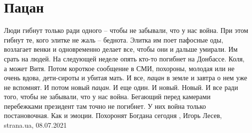  
 
 
 
 
\chapter{Пацан}

Люди гибнут только ради одного – чтобы не забывали, что у нас война. При этом
гибнут те, кого элитке не жаль – беднота. Элитка им поет пафосные оды,
возлагает венки и одновременно делает все, чтобы они и дальше умирали.  Им
срать на людей. На следующей неделе опять кто-то погибнет на Донбассе. Коля, а
может Витя. Потом короткое сообщение в СМИ, похороны, молодая или не очень
вдова, дети-сироты и убитая мать. И все, \emph{пацан} в земле и завтра о нем
уже не вспомнят. И потом новый \emph{пацан}. И еще один. И новый. Новый. И все
ради того, чтобы не забывали, что у нас война.  Бегающий перед камерами
перебежками президент там точно не погибнет. У них война только постановочная.
Как и эмоции.  Похоронят Богдана сегодня
, 
Игорь Лесев, strana.ua, 08.07.2021
